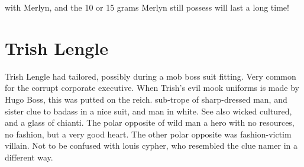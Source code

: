 \documentclass[12pt]{book}
\begin{document}
with Merlyn, and the 10 or 15 grams Merlyn still possess will last a long time!



\chapter{Trish Lengle}

Trish Lengle had tailored, possibly during a mob boss suit fitting. Very common for the corrupt corporate executive. When Trish's evil mook uniforms is made by Hugo Boss, this was putted on the reich. sub-trope of sharp-dressed man, and sister clue to badass in a nice suit, and man in white. See also wicked cultured, and a glass of chianti. The polar opposite of wild man  a hero with no resources, no fashion, but a very good heart. The other polar opposite was fashion-victim villain. Not to be confused with louis cypher, who resembled the clue namer in a different way.
\end{document}
